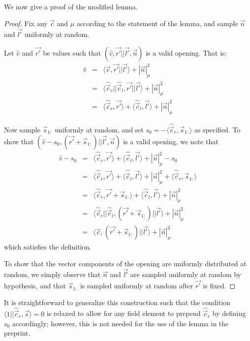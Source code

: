 \documentclass{article}
\begin{document}
We now give a proof of the modified lemma.

\begin{proof}
	Fix any $\vec{c}$ and $\mu$ according to the statement of the lemma, and sample $\vec{n}$ and $\vec{l'}$ uniformly at random.

	Let $\hat{v}$ and $\vec{r'}$ be values such that $(\hat{v}, \vec{r'} || \vec{l'}, \vec{n})$ is a valid opening.
	That is:
	\begin{eqnarray*}
		\hat{v} &=& \langle \vec{c}, \vec{r'} || \vec{l'} \rangle + |\vec{n}|_\mu^2 \\
		&=& \langle \hat{\vec{c}}_r || \hat{\vec{c}}_l, \vec{r'} || \vec{l'} \rangle + |\vec{n}|_\mu^2 \\
		&=& \langle \hat{\vec{c}}_r, \vec{r'} \rangle + \langle \hat{\vec{c}}_l, \vec{l'} \rangle + |\vec{n}|_\mu^2
	\end{eqnarray*}

	Now sample $\vec{s}_{1:}$ uniformly at random, and set $s_0 = -\langle \hat{\vec{c}}_r, \vec{s}_{1:} \rangle$ as specified.
	To show that $(\hat{v} - s_0, (\vec{r'} + \vec{s}_{1:}) || \vec{l'}, \vec{n})$ is a valid opening, we note that
	\begin{eqnarray*}
		\hat{v} - s_0 &=& \langle \hat{\vec{c}}_r, \vec{r'} \rangle + \langle \hat{\vec{c}}_l, \vec{l'} \rangle + |\vec{n}|_\mu^2 - s_0 \\
		&=& \langle \hat{\vec{c}}_r, \vec{r'} \rangle + \langle \hat{\vec{c}}_l, \vec{l'} \rangle + |\vec{n}|_\mu^2 + \langle \hat{\vec{c}}_r, \vec{s}_{1:} \rangle \\
		&=& \langle \hat{\vec{c}}_r, \vec{r'} + \vec{s}_{1:} \rangle + \langle \hat{\vec{c}}_l, \vec{l'} \rangle + |\vec{n}|_\mu^2 \\
		&=& \langle \hat{\vec{c}}_r || \hat{\vec{c}}_l, (\vec{r'} + \vec{s}_{1:}) || \vec{l'} \rangle + |\vec{n}|_\mu^2 \\
		&=& \langle \vec{c}, (\vec{r'} + \vec{s}_{1:}) || \vec{l'} \rangle + |\vec{n}|_\mu^2
	\end{eqnarray*}
	which satisfies the definition.

	To show that the vector components of the opening are uniformly distributed at random, we simply observe that $\vec{n}$ and $\vec{l'}$ are sampled uniformly at random by hypothesis, and that $\vec{s}_{1:}$ is sampled uniformly at random after $\vec{r'}$ is fixed.
\end{proof}

It is straightforward to generalize this construction such that the condition $\langle 1 || \hat{\vec{c}}_r, \vec{s} \rangle = 0$ is relaxed to allow for any field element to prepend $\hat{\vec{c}}_r$ by defining $s_0$ accordingly; however, this is not needed for the use of the lemma in the preprint.
\end{document}
